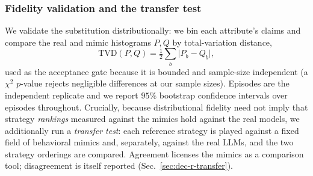 \subsubsection{Fidelity validation and the transfer test}
\label{sec:dec-r-fidelity}
We validate the substitution distributionally: we bin each attribute's claims and
compare the real and mimic histograms $P,Q$ by total-variation distance,
\begin{equation}
\mathrm{TVD}(P,Q) = \tfrac12\sum_b \lvert P_b - Q_b\rvert,
\label{eq:dec-r-tvd}
\end{equation}
used as the acceptance gate because it is bounded and sample-size independent (a
$\chi^2$ $p$-value rejects negligible differences at our sample sizes). Episodes
are the independent replicate and we report $95\%$ bootstrap confidence intervals
over episodes throughout. Crucially, because distributional fidelity need not
imply that strategy \emph{rankings} measured against the mimics hold against the
real models, we additionally run a \emph{transfer test}: each reference strategy
is played against a fixed field of behavioral mimics and, separately, against the
real LLMs, and the two strategy orderings are compared. Agreement licenses the
mimics as a comparison tool; disagreement is itself reported (Sec.~\ref{sec:dec-r-transfer}).
